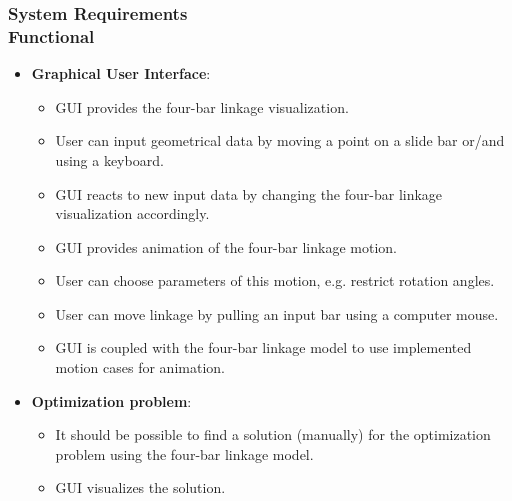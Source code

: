 \documentclass[ucs,10pt]{beamer}
\begin{document}
\begin{frame}
\frametitle{System Requirements \\
    \small \color{rwth-blue} Functional}
    \begin{itemize}
        \item \textbf{Graphical User Interface}:
        \begin{itemize}
            \item GUI provides the four-bar linkage visualization.
            \item User can input geometrical data by moving a point on a slide bar or/and using a keyboard.
            \item GUI reacts to new input data by changing the four-bar linkage visualization accordingly.
            \item GUI provides animation of the four-bar linkage motion.
            \item User can choose parameters of this motion, e.g. restrict rotation angles.
            \item User can move linkage by pulling an input bar using a computer mouse.
            \item GUI is coupled with the four-bar linkage model to use implemented motion cases for animation. 
        \end{itemize}
        \item \textbf{Optimization problem}:
        \begin{itemize}
            \item It should be possible to find a solution (manually) for the optimization problem using the four-bar linkage model.
            \item GUI visualizes the solution.
        \end{itemize}
    \end{itemize}
\end{frame}
\end{document}
